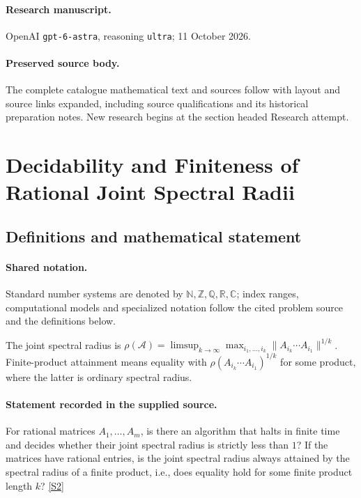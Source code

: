 \documentclass[11pt]{article}
\begin{document}
\paragraph{Research manuscript.} OpenAI \texttt{gpt-6-astra}, reasoning \texttt{ultra}; 11 October 2026.
\paragraph{Preserved source body.} The complete catalogue mathematical text and sources follow with layout and source links expanded, including source qualifications and its historical preparation notes. New research begins at the section headed Research attempt.

\section{Decidability and Finiteness of Rational Joint Spectral Radii}\label{statement}

\subsection{Definitions and mathematical statement}

\paragraph{Shared notation.}Standard number systems are denoted by $\mathbb N,\mathbb Z,\mathbb Q,\mathbb R,\mathbb C$; index ranges, computational models and specialized notation follow the cited problem source and the definitions below.


The joint spectral radius is $\rho(\mathcal A)=\limsup_{k\to\infty}\max_{i_1,\ldots,i_k}\lVert A_{i_k}\cdots A_{i_1}\rVert^{1/k}$. Finite-product attainment means equality with $\rho(A_{i_k}\cdots A_{i_1})^{1/k}$ for some product, where the latter is ordinary spectral radius.
\paragraph{Statement recorded in the supplied source.}
For rational matrices $A_1,\ldots,A_m$, is there an algorithm that halts in finite time and decides whether their joint spectral radius is strictly less than $1$? If the matrices have rational entries, is the joint spectral radius always attained by the spectral radius of a finite product, i.e., does equality hold for some finite product length $k$? \href{https://doi.org/10.4171/owr/2014/17}{[S2]}
\end{document}
